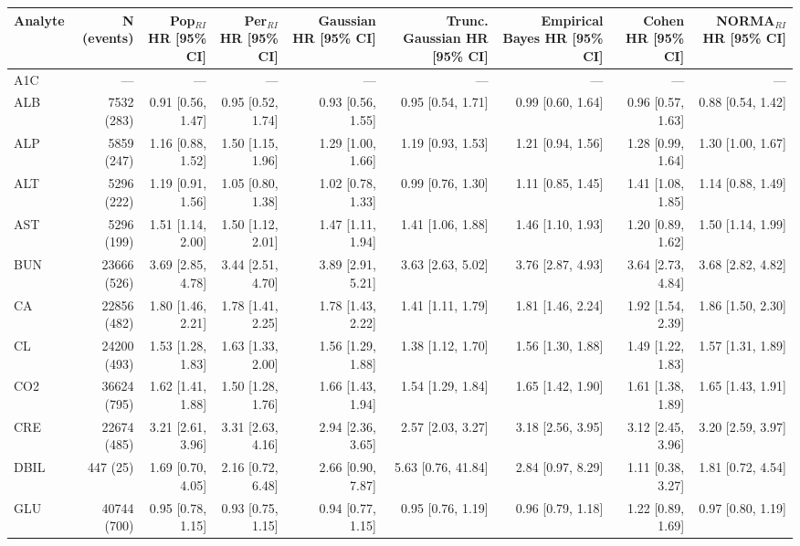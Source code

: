 \begin{table}[ht]
\centering
\footnotesize
\begin{tabular}{lrrrrrrrr}
\toprule
Analyte & N (events) & Pop$_{RI}$ HR [95\% CI] & Per$_{RI}$ HR [95\% CI] & Gaussian HR [95\% CI] & Trunc. Gaussian HR [95\% CI] & Empirical Bayes HR [95\% CI] & Cohen HR [95\% CI] & NORMA$_{RI}$ HR [95\% CI] \\
\midrule
A1C & --- & --- & --- & --- & --- & --- & --- & --- \\
ALB & 7532 (283) & 0.91 [0.56, 1.47] & 0.95 [0.52, 1.74] & 0.93 [0.56, 1.55] & 0.95 [0.54, 1.71] & 0.99 [0.60, 1.64] & 0.96 [0.57, 1.63] & 0.88 [0.54, 1.42] \\
ALP & 5859 (247) & 1.16 [0.88, 1.52] & 1.50 [1.15, 1.96] & 1.29 [1.00, 1.66] & 1.19 [0.93, 1.53] & 1.21 [0.94, 1.56] & 1.28 [0.99, 1.64] & 1.30 [1.00, 1.67] \\
ALT & 5296 (222) & 1.19 [0.91, 1.56] & 1.05 [0.80, 1.38] & 1.02 [0.78, 1.33] & 0.99 [0.76, 1.30] & 1.11 [0.85, 1.45] & 1.41 [1.08, 1.85] & 1.14 [0.88, 1.49] \\
AST & 5296 (199) & 1.51 [1.14, 2.00] & 1.50 [1.12, 2.01] & 1.47 [1.11, 1.94] & 1.41 [1.06, 1.88] & 1.46 [1.10, 1.93] & 1.20 [0.89, 1.62] & 1.50 [1.14, 1.99] \\
BUN & 23666 (526) & 3.69 [2.85, 4.78] & 3.44 [2.51, 4.70] & 3.89 [2.91, 5.21] & 3.63 [2.63, 5.02] & 3.76 [2.87, 4.93] & 3.64 [2.73, 4.84] & 3.68 [2.82, 4.82] \\
CA & 22856 (482) & 1.80 [1.46, 2.21] & 1.78 [1.41, 2.25] & 1.78 [1.43, 2.22] & 1.41 [1.11, 1.79] & 1.81 [1.46, 2.24] & 1.92 [1.54, 2.39] & 1.86 [1.50, 2.30] \\
CL & 24200 (493) & 1.53 [1.28, 1.83] & 1.63 [1.33, 2.00] & 1.56 [1.29, 1.88] & 1.38 [1.12, 1.70] & 1.56 [1.30, 1.88] & 1.49 [1.22, 1.83] & 1.57 [1.31, 1.89] \\
CO2 & 36624 (795) & 1.62 [1.41, 1.88] & 1.50 [1.28, 1.76] & 1.66 [1.43, 1.94] & 1.54 [1.29, 1.84] & 1.65 [1.42, 1.90] & 1.61 [1.38, 1.89] & 1.65 [1.43, 1.91] \\
CRE & 22674 (485) & 3.21 [2.61, 3.96] & 3.31 [2.63, 4.16] & 2.94 [2.36, 3.65] & 2.57 [2.03, 3.27] & 3.18 [2.56, 3.95] & 3.12 [2.45, 3.96] & 3.20 [2.59, 3.97] \\
DBIL & 447 (25) & 1.69 [0.70, 4.05] & 2.16 [0.72, 6.48] & 2.66 [0.90, 7.87] & 5.63 [0.76, 41.84] & 2.84 [0.97, 8.29] & 1.11 [0.38, 3.27] & 1.81 [0.72, 4.54] \\
GLU & 40744 (700) & 0.95 [0.78, 1.15] & 0.93 [0.75, 1.15] & 0.94 [0.77, 1.15] & 0.95 [0.76, 1.19] & 0.96 [0.79, 1.18] & 1.22 [0.89, 1.69] & 0.97 [0.80, 1.19] \\

\end{tabular}
\end{table}
